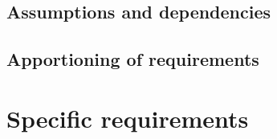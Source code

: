 \documentclass{article}
\begin{document}
\subsection{Assumptions and dependencies}


\subsection{Apportioning of requirements}



\section{Specific requirements}

\end{document}

